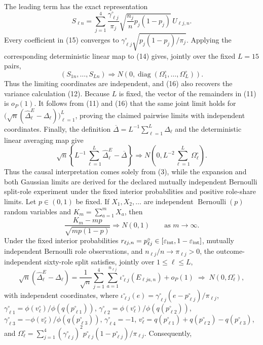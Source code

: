 The leading term has the exact representation
\[
 S_{\ell n}=\sum_{j=1}^4
 \frac{\gamma^{\circ}_{\ell j}}{\pi_j}
 \sqrt{\frac{n_j}{n}p_j(1-p_j)}\,U_{\ell j,n}.
\tag{15}
\]
Every coefficient in (15) converges to
\(
\gamma^{\circ}_{\ell j}\sqrt{p_j(1-p_j)/\pi_j}
\).
Applying the corresponding deterministic linear map to (14) gives, jointly over the fixed \(L=15\) pairs,
\[
 (S_{1n},\ldots,S_{Ln})
 \Rightarrow N\!\left(0,\operatorname{diag}(\Omega^{\circ}_1,\ldots,\Omega^{\circ}_L)\right).
\tag{16}
\]
Thus the limiting coordinates are independent, and (16) also recovers the variance calculation (12). Because \(L\) is fixed, the vector of the remainders in (11) is \(o_P(1)\). It follows from (11) and (16) that the same joint limit holds for \(\bigl(\sqrt n(\widehat\Delta^E_\ell-\Delta_\ell)\bigr)_{\ell=1}^L\), proving the claimed pairwise limits with independent coordinates. Finally, the definition \(\overline\Delta=L^{-1}\sum_{\ell=1}^L\Delta_\ell\) and the deterministic linear averaging map give
\[
 \sqrt n\left\{L^{-1}\sum_{\ell=1}^{L}\widehat\Delta^E_{\ell}-\overline\Delta\right\}
 \Rightarrow N\!\left(0,L^{-2}\sum_{\ell=1}^{L}\Omega^{\circ}_{\ell}\right).
\]
Thus the causal interpretation comes solely from (3), while the expansion and both Gaussian limits are derived for the declared mutually independent Bernoulli split-role experiment under the fixed interior probabilities and positive role-share limits.
Let \(p\in(0,1)\) be fixed. If \(X_1,X_2,\ldots\) are independent \(\operatorname{Bernoulli}(p)\) random variables and \(K_m=\sum_{a=1}^mX_a\), then
\[
 \frac{K_m-mp}{\sqrt{mp(1-p)}}\Rightarrow N(0,1)
 \qquad\text{as }m\to\infty.
\]
Under the fixed interior probabilities \(r_{\ell j,n}=p^{\circ}_{\ell j}\in[\varepsilon_{\rm int},1-\varepsilon_{\rm int}]\), mutually independent Bernoulli role observations, and \(n_{\ell j}/n\to\pi_{\ell j}>0\), the outcome-independent sixty-role split satisfies, jointly over \(1\le\ell\le L\),
\[
\sqrt n(\widehat\Delta^E_{\ell}-\Delta_{\ell})
=\frac1{\sqrt n}\sum_{j=1}^{4}\sum_{a=1}^{n_{\ell j}}
\iota^{\circ}_{\ell j}(E_{\ell j a,n})+o_{P}(1)
\;\Rightarrow\;N(0,\Omega^{\circ}_{\ell}),
\]
with independent coordinates, where \(\iota^{\circ}_{\ell j}(e)=\gamma^{\circ}_{\ell j}(e-p^{\circ}_{\ell j})/\pi_{\ell j}\), \(\gamma^{\circ}_{\ell1}=\phi(v^{\circ}_{\ell})/\phi(q(p^{\circ}_{\ell1}))\), \(\gamma^{\circ}_{\ell2}=\phi(v^{\circ}_{\ell})/\phi(q(p^{\circ}_{\ell2}))\), \(\gamma^{\circ}_{\ell3}=-\phi(v^{\circ}_{\ell})/\phi(q(p^{\circ}_{\ell3}))\), \(\gamma^{\circ}_{\ell4}=-1\), \(v^{\circ}_{\ell}=q(p^{\circ}_{\ell1})+q(p^{\circ}_{\ell2})-q(p^{\circ}_{\ell3})\), and \(\Omega^{\circ}_{\ell}=\sum_{j=1}^{4}(\gamma^{\circ}_{\ell j})^2p^{\circ}_{\ell j}(1-p^{\circ}_{\ell j})/\pi_{\ell j}\). Consequently,
